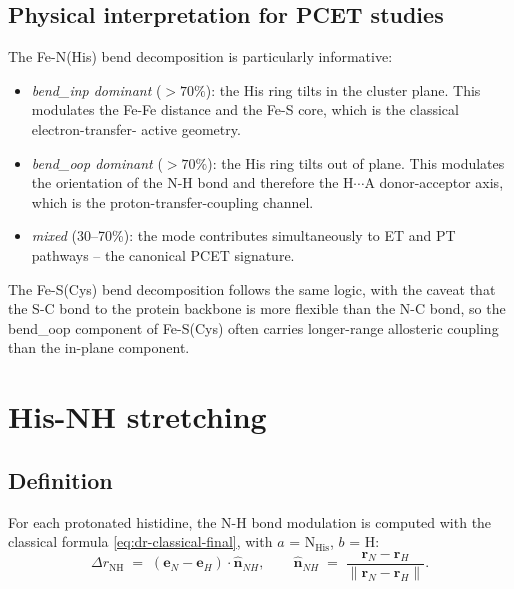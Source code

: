 \documentclass[10pt,a4paper,twoside]{article}
\newcommand{\rvec}{\mathbf{r}}
\newcommand{\evec}{\mathbf{e}}
\newcommand{\nhat}{\hat{\mathbf{n}}}
\newcommand{\codref}[1]{%
  \quad\text{\textcolor{gray!70!black}{\footnotesize $\rightsquigarrow$~\texttt{#1}}}}
\begin{document}
\subsection{Physical interpretation for PCET studies}

The Fe-N(His) bend decomposition is particularly informative:

\begin{itemize}
  \item \emph{bend\_inp dominant} ($> 70\%$): the His ring tilts in
        the cluster plane. This modulates the Fe-Fe distance and
        the Fe-S core, which is the classical electron-transfer-
        active geometry.
  \item \emph{bend\_oop dominant} ($> 70\%$): the His ring tilts out
        of plane. This modulates the orientation of the N-H bond
        and therefore the H$\cdots$A donor-acceptor axis, which is
        the proton-transfer-coupling channel.
  \item \emph{mixed} (30--70\%): the mode contributes simultaneously
        to ET and PT pathways -- the canonical PCET signature.
\end{itemize}

The Fe-S(Cys) bend decomposition follows the same logic, with the
caveat that the S-C bond to the protein backbone is more flexible
than the N-C bond, so the bend\_oop component of Fe-S(Cys) often
carries longer-range allosteric coupling than the in-plane component.

\section{His-NH stretching}
\label{sec:his-nh}

\subsection{Definition}

\codref{core.analyze\_his\_hn}

For each protonated histidine, the N-H bond modulation is computed
with the classical formula
\cref{eq:dr-classical-final}, with $a$ = N$_\text{His}$,
$b$ = H:
\begin{equation}
  \Delta r_\text{NH}
    \;=\;
  (\evec_N - \evec_H) \cdot \nhat_{NH},
  \qquad
  \nhat_{NH} \;=\; \frac{\rvec_N - \rvec_H}{\lVert\rvec_N - \rvec_H\rVert}.
\end{equation}
\end{document}
